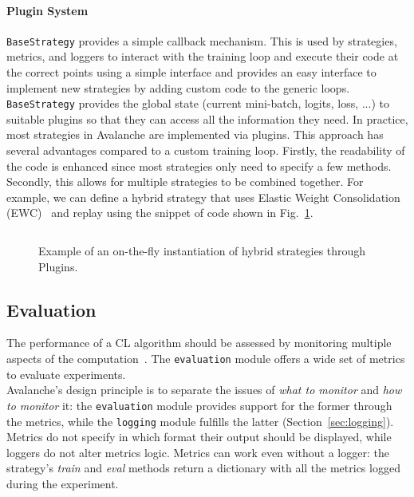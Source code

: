 \documentclass[final]{cvpr}
\theoremstyle{definition}
\newcommand{\codeinline}[1]{\texttt{#1}}
\begin{document}
\paragraph{Plugin System} \codeinline{BaseStrategy} provides a simple callback mechanism. This is used by strategies, metrics, and loggers to interact with the training loop and execute their code at the correct points using a simple interface and provides an easy interface to implement new strategies by adding custom code to the generic loops. \codeinline{BaseStrategy} provides the global state (current mini-batch, logits, loss, ...) to suitable plugins so that they can access all the information they need. In practice, most strategies in Avalanche are implemented via plugins. This approach has several advantages compared to a custom training loop. Firstly, the readability of the code is enhanced since most strategies only need to specify a few methods. Secondly, this allows for multiple strategies to be combined together. For example, we can define a hybrid strategy that uses Elastic Weight Consolidation (EWC)~\cite{kirkpatrick2017} and replay using the snippet of code shown in Fig.~\ref{code:hybrid-strategies}. %

\begin{figure}[ht]
\begin{tcolorbox}[title={Hybrid Strategies}, colback=mygray]
\inputminted{python}{training_hybrid.py}
\end{tcolorbox}
\caption{Example of an on-the-fly instantiation of hybrid strategies through Plugins.}
\label{code:hybrid-strategies}
\end{figure}

\subsection{Evaluation} \label{sec:eval}

The performance of a CL algorithm should be assessed by monitoring multiple aspects of the computation~\cite{lesort2020}. The \codeinline{evaluation} module offers a wide set of metrics to evaluate experiments.\\
Avalanche's design principle is to separate the issues of \textit{what to monitor} and \textit{how to monitor} it: the \codeinline{evaluation} module provides support for the former through the metrics, while the \codeinline{logging} module fulfills the latter (Section~\ref{sec:logging}). Metrics do not specify in which format their output should be displayed, while loggers do not alter metrics logic. Metrics can work even without a logger: the strategy's \emph{train} and \emph{eval} methods return a dictionary with all the metrics logged during the experiment. 
\end{document}
